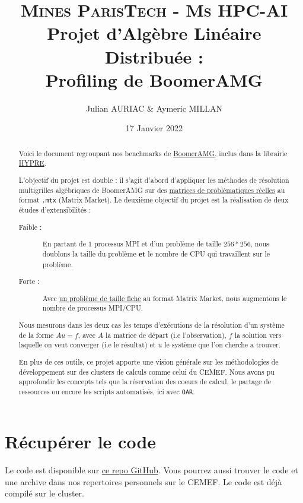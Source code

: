 \documentclass[10pt,twocolumn,letterpaper]{article}
\title{
		\usefont{OT1}{bch}{b}{n}
		\normalfont \normalsize \textsc{Mines ParisTech - Ms HPC-AI} \\ [10pt]
		\huge Projet d'Algèbre Linéaire Distribuée :\\ Profiling de BoomerAMG \\
}
\author{Julian AURIAC \& Aymeric MILLAN}
\affil{Cours de Christophe BOVET}
\date{17 Janvier 2022}
\def\code#1{\texttt{#1}}
\begin{document}
\maketitle

\begin{abstract}
Voici le document regroupant nos benchmarks de
\href{https://hypre.readthedocs.io/en/latest/solvers-boomeramg.html}{BoomerAMG},
inclus dans la librairie
\href{https://hypre.readthedocs.io/en/latest/index.html}{HYPRE}.

L'objectif du projet est double : il s'agit d'abord d'appliquer les méthodes de
résolution multigrilles algébriques de BoomerAMG sur des
\href{https://sparse.tamu.edu/}{matrices de problématiques réelles} au format
\code{.mtx} (Matrix Market).
Le deuxième objectif du projet est la réalisation de deux études
d'extensibilités :
\begin{description}
    \item [\textbullet\space Faible :] En partant de $1$ processus MPI et
d'un problème de taille $256*256$, nous doublons la taille du problème
\textbf{et} le nombre de CPU qui travaillent sur le problème.
    \item [\textbullet\space Forte :] Avec
\href{https://sparse.tamu.edu/Janna/Emilia_923}{un problème de taille fiche}
au format Matrix Market, nous augmentons le nombre de processus MPI/CPU.
\end{description}

Nous mesurons dans les deux cas les temps d'exécutions de la résolution d'un
système de la forme $Au = f$, avec $A$ la matrice de départ (i.e l'observation),
$f$ la solution vers laquelle on veut converger (i.e le résultat) et $u$
le système que l'on cherche a trouver.

En plus de ces outils, ce projet apporte une vision générale sur les
méthodologies de développement sur des clusters de calculs comme celui du CEMEF. 
Nous avons pu approfondir les concepts tels que la réservation des coeurs de
calcul, le partage de ressources ou encore les scripts automatisés,
ici avec \code{OAR}.
\end{abstract}

\section{Récupérer le code}
Le code est disponible sur
\href{https://github.com/Aympab/HypreBoomerAMG_Benchmark}{ce repo GitHub}.
Vous pourrez aussi trouver le code et une archive dans nos repertoires
personnels sur le CEMEF. Le code est déjà compilé sur le cluster.
\end{document}
